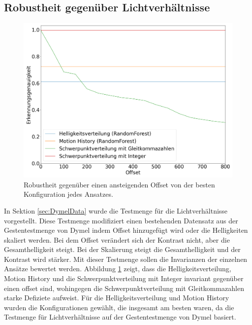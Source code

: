 \subsection{Robustheit gegenüber Lichtverhältnisse}
\label{sec:brightness_eval}
\begin{figure}[h!]
    \centering
    \includegraphics[width=\linewidth]{images/brightness_offset.png}
    \caption{Robustheit gegenüber einen ansteigenden Offset von der besten Konfiguration jedes Ansatzes.}
    \label{fig:brightness_offset}
\end{figure}
In Sektion \ref{sec:DymelData} wurde die Testmenge für die Lichtverhältnisse vorgestellt. Diese Testmenge modifiziert einen bestehenden Datensatz aus der Gestentestmenge von Dymel indem Offset hinzugefügt wird
oder die Helligkeiten skaliert werden. Bei dem Offset verändert sich der Kontrast nicht, aber die Gesamthelligkeit steigt. Bei der Skalierung steigt die Gesamthelligkeit und der Kontrast wird stärker. Mit
dieser Testmenge sollen die Invarianzen der einzelnen Ansätze bewertet werden.
\newline
\newline
Abbildung \ref{fig:brightness_offset} zeigt, dass die Helligkeitsverteilung, Motion History und die Schwerpunktverteilung
mit Integer invariant gegenüber einen offset sind, wohingegen die Schwerpunktverteilung mit Gleitkommazahlen starke Defiziete aufweist. Für die Helligkeitsverteilung und Motion History wurden die
Konfigurationen gewählt, die insgesamt am besten waren, da die Testmenge für Lichtverhältnisse auf der Gestentestmenge von Dymel basiert.
